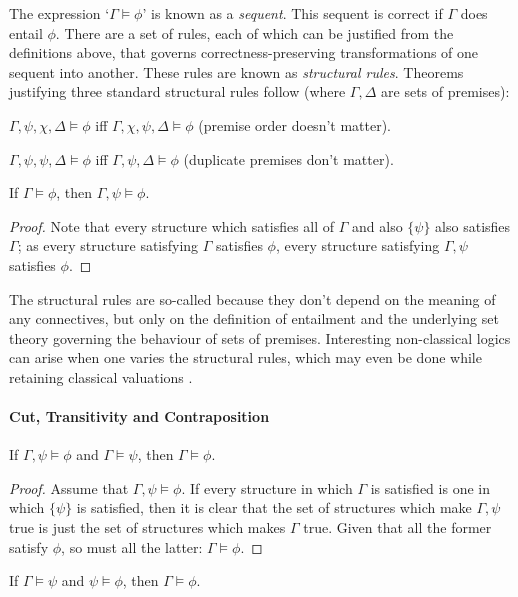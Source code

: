 The expression ‘$\Gamma \vDash \phi$’ is known as a \emph{sequent}. This sequent is correct if $\Gamma$ does entail $\phi$. There are a set of rules, each of which can be justified from the definitions above, that governs correctness-preserving transformations of one sequent into another. These rules are known as \emph{structural rules}. Theorems justifying three standard structural rules follow (where $\Gamma, \Delta$ are sets of premises): \begin{theorem}[Permutation] $\Gamma, \psi,\chi,\Delta \vDash \phi$ iff $\Gamma, \chi,\psi,\Delta \vDash \phi$ (premise order doesn't matter).\end{theorem}
\begin{theorem}[Contraction]$\Gamma, \psi,\psi, \Delta \vDash \phi$ iff $\Gamma, \psi,\Delta \vDash \phi$ (duplicate premises don't matter).
\end{theorem}
\begin{theorem}
	[Weakening] If $\Gamma \vDash \phi$, then $\Gamma, \psi \vDash	\phi$.
	\begin{proof}
		Note that every structure which satisfies all of $\Gamma$ and also $\{\psi\}$ also satisfies $\Gamma$; as every structure satisfying $\Gamma$ satisfies $\phi$, every structure satisfying $\Gamma, \psi$ satisfies $\phi$.
	\end{proof}
\end{theorem}
The structural rules are so-called because they don't depend on the meaning of any connectives, but only on the definition of entailment and the underlying set theory governing the behaviour of sets of premises. Interesting non-classical logics can arise when one varies the structural rules, which may even be done while retaining classical valuations \citep{restsub}. 

\paragraph{Cut, Transitivity and Contraposition}

\begin{theorem}[Cut] If $\Gamma, \psi \vDash \phi$ and $\Gamma \vDash \psi$, then $\Gamma \vDash \phi$. \begin{proof}
	Assume that $\Gamma, \psi \vDash \phi$. If every structure in which $\Gamma$ is satisfied is one in which $\{\psi\}$ is satisfied, then it is clear that the set of structures
	which make $\Gamma, \psi$ true is just the set of structures which makes 
	$\Gamma$ true. Given that all the former satisfy $\phi$, so must all the latter: $\Gamma \vDash \phi$.
\end{proof}
\end{theorem}
\begin{theorem}[Transitivity]
	If $\Gamma \vDash \psi$ and $\psi \vDash \phi$, then $\Gamma \vDash \phi$.
\end{theorem}

